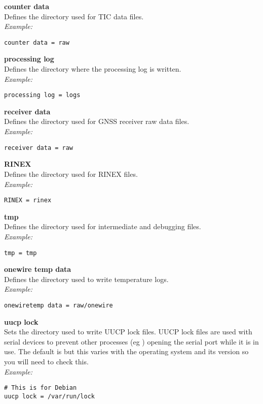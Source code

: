 {\bfseries counter data}\\
Defines the directory used for TIC data files.\\
\textit{Example:}
\begin{lstlisting}
counter data = raw
\end{lstlisting}

{\bfseries processing log}\\
Defines the directory where the  processing log is written.\\
\textit{Example:}
\begin{lstlisting}
processing log = logs
\end{lstlisting}

{\bfseries receiver data}\\
Defines the directory used for GNSS receiver raw data files.\\
\textit{Example:}
\begin{lstlisting}
receiver data = raw
\end{lstlisting}

{\bfseries RINEX}\\
Defines the directory used for RINEX files.\\
\textit{Example:}
\begin{lstlisting}
RINEX = rinex
\end{lstlisting}

{\bfseries tmp}\\
Defines the directory used for intermediate and debugging files.\\
\textit{Example:}
\begin{lstlisting}
tmp = tmp
\end{lstlisting}

{\bfseries onewire temp data}\\
Defines the directory used to write temperature logs.\\
\textit{Example:}
\begin{lstlisting}
onewiretemp data = raw/onewire
\end{lstlisting}

{\bfseries uucp lock}\\
Sets the directory used to write UUCP lock files. UUCP lock files are used with serial devices to prevent
other processes (eg ) opening the serial port while it is in use. The default is 
but this varies with the operating system and its version so you will need to check this.\\
\textit{Example:}
\begin{lstlisting}
# This is for Debian
uucp lock = /var/run/lock
\end{lstlisting}

